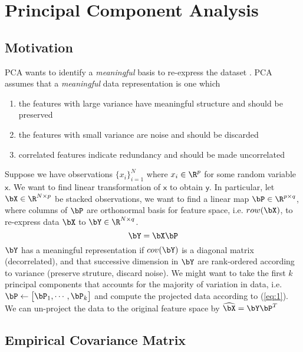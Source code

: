 \documentclass[11pt]{article}
\newcommand\ry{\ensuremath{\mathsf{y}}}
\newcommand\rx{\ensuremath{\mathsf{x}}}
\begin{document}
\section{Principal Component Analysis}

\subsection{Motivation} 

PCA wants to identify a \textit{meaningful} basis to re-express the dataset \cite{shlensTutorialPrincipalComponent2014}. PCA assumes that a \textit{meaningful} data representation is one which
\begin{enumerate}
    \item the features with large variance have meaningful structure and should be preserved
    \item the features with small variance are noise and should be discarded
    \item correlated features indicate redundancy and should be made uncorrelated
\end{enumerate}
Suppose we have observations $\{x_i\}_{i=1}^N$ where $x_i\in \R^p$ for some random variable $\rx$. We want to find linear transformation of $\rx$ to obtain $\ry$. In particular, let $\bX \in \R^{N\times p}$ be stacked observations, we want to find a linear map $\bP \in \R^{p\times q}$, where columns of $\bP$ are orthonormal basis for feature space, i.e. $row(\bX)$, to re-express data $\bX$ to $\bY \in \R^{N\times q}$.
\begin{equation}
    \label{eq:1}
    \bY = \bX \bP
\end{equation}
$\bY$ has a meaningful representation if $cov(\bY)$ is a diagonal matrix (decorrelated), and that successive dimension in $\bY$ are rank-ordered according to variance (preserve struture, discard noise). We might want to take the first $k$ principal components that accounts for the majority of variation in data, i.e. $\bP \leftarrow \begin{bmatrix} \bP_1,\cdots,\bP_k \end{bmatrix}$ and compute the projected data according to (\ref{eq:1}). We can un-project the data to the original feature space by $\widehat{\bX} = \bY\bP^T$

\subsection{Empirical Covariance Matrix}
\end{document}
